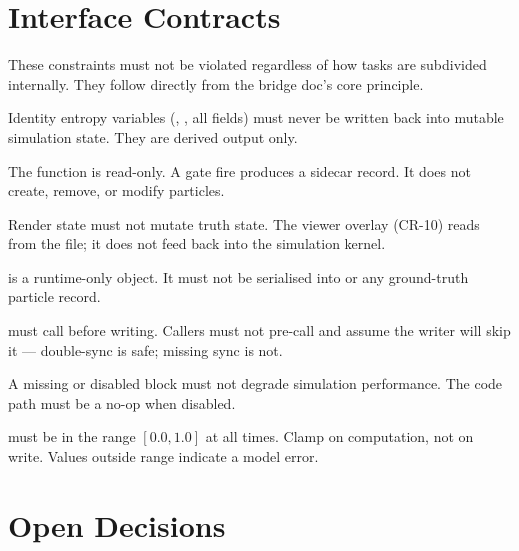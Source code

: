 \documentclass[11pt, a4paper]{article}
\begin{document}
\section{Interface Contracts}

These constraints must not be violated regardless of how tasks are subdivided
internally. They follow directly from the bridge doc's core principle.

\vspace{6pt}
\begin{infobox}
\small
\begin{description}[leftmargin=2.4cm, style=sameline, font=\ttfamily\small]
  \item[IC-01] Identity entropy variables (, , all
     fields) must never be written back into mutable simulation
    state. They are derived output only.
  \item[IC-02] The  function is read-only. A gate fire
    produces a sidecar record. It does not create, remove, or modify particles.
  \item[IC-03] Render state must not mutate truth state. The viewer overlay (CR-10)
    reads from the  file; it does not feed back into the simulation kernel.
  \item[IC-04]  is a runtime-only object. It must not be
    serialised into  or any ground-truth particle record.
  \item[IC-05]  must call  before
    writing. Callers must not pre-call  and assume the writer will skip
    it --- double-sync is safe; missing sync is not.
  \item[IC-06] A missing or disabled  block must
    not degrade simulation performance. The code path must be a no-op when disabled.
  \item[IC-07]  must be in the range $[0.0, 1.0]$ at all times. Clamp on
    computation, not on write. Values outside range indicate a model error.
\end{description}
\end{infobox}

\section{Open Decisions}
\end{document}

